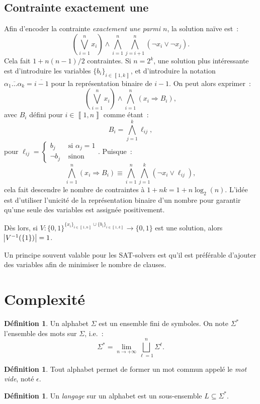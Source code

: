 \documentclass{article}
\theoremstyle{definition}
\newtheorem{déf}[thm]{Définition}
\theoremstyle{remark}
\newcommand{\intint}[2]{\left\llbracket#1, #2\right\rrbracket}
\begin{document}
	\subsection{Contrainte exactement une}
		Afin d'encoder la contrainte \textit{exactement une parmi $n$}, la solution naïve est~:
		\[\left(\bigvee_{i=1}^nx_i\right) \land \bigwedge_{i=1}^n\bigwedge_{j=i+1}^n(\lnot x_i \lor \lnot x_j).\]
		Cela fait $1+n(n-1)/2$ contraintes. Si $n=2^k$, une solution plus intéressante est d'introduire les variables $\{b_i\}_{i \in \intint 1k}$, et d'introduire
		la notation $\overline {\alpha_1\ldots\alpha_k} = \overline {i-1}$ pour la représentation binaire de $i-1$. On peut alors exprimer~:
		\[\left(\bigvee_{i=1}^nx_i\right) \land \bigwedge_{i=1}^n(x_i \Rightarrow B_i),\]
		avec $B_i$ défini pour $i \in \intint 1n$ comme étant~:
		\[B_i = \bigwedge_{j=1}^k\ell_{ij},\]
		pour $\ell_{ij} = \begin{cases}b_j &\text{ si }\alpha_j = 1 \\\lnot b_j&\text{ sinon}\end{cases}$. Puisque~:
		\[\bigwedge_{i=1}^n(x_i \Rightarrow B_i) \equiv \bigwedge_{i=1}^n\bigwedge_{j=1}^k(\lnot x_i \lor \ell_{ij}),\]
		cela fait descendre le nombre de contraintes à $1+nk = 1+n\log_2(n)$. L'idée est d'utiliser l'unicité de la représentation binaire d'un nombre pour garantir
		qu'une seule des variables est assignée positivement.

		Dès lors, si $V : \{0, 1\}^{\{x_i\}_{i \in \intint 1n} \cup \{b_i\}_{i \in \intint 1k}} \to \{0, 1\}$ est une solution, alors $\abs {V^{-1}(\{1\})} = 1$.

		Un principe souvent valable pour les SAT-solvers est qu'il est préférable d'ajouter des variables afin de minimiser le nombre de clauses.

\section{Complexité}
	\begin{déf} Un alphabet $\Sigma$ est un ensemble fini de symboles. On note $\Sigma^*$ l'ensemble des mots sur $\Sigma$, i.e.~:
	\[\Sigma^* = \lim_{n \to +\infty}\bigsqcup_{\ell=1}^n\Sigma^\ell.\]
	\end{déf}

	\begin{déf} Tout alphabet permet de former un mot commun appelé le \textit{mot vide}, noté $\epsilon$.
	\end{déf}

	\begin{déf} Un \textit{langage} sur un alphabet est un sous-ensemble $L \subseteq \Sigma^*$.
	\end{déf}
\end{document}

